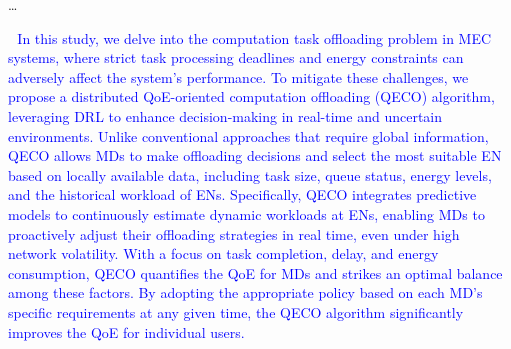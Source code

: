 \documentclass[12pt,draftclsnofoot,onecolumn]{IEEEtran}
\newcommand{\rev}[1]{{\color{blue}#1}} %
\newcommand{\rev}[1]{#1}
\newenvironment{my}[2]%
{\begin{list}{}%
{\setlength{\rightmargin}{#1}\setlength{\leftmargin}{#2}}%


 \item[]{}

} {\end{list}}
\begin{document}
\begin{enumerate}
\begin{my}{1cm}{1cm}
	\rev{ 
	
	\dots





\textcolor{blue}{\,\,\,\,In this study, we delve into the computation task offloading problem in MEC systems, where strict task processing deadlines and energy constraints can adversely affect the system's performance. To mitigate these challenges, we propose a distributed QoE-oriented computation offloading (QECO) algorithm, leveraging DRL to enhance decision-making in real-time and uncertain environments. Unlike conventional approaches that require global information, QECO allows MDs to make offloading decisions and select the most suitable EN based on locally available data, including task size, queue status, energy levels, and the historical workload of ENs. Specifically, QECO integrates predictive models to continuously estimate dynamic workloads at ENs, enabling MDs to proactively adjust their offloading strategies in real time, even under high network volatility. With a focus on task completion, delay, and energy consumption, QECO quantifies the QoE for MDs and strikes an optimal balance among these factors. By adopting the appropriate policy based on each MD’s specific requirements at any given time, the QECO algorithm significantly improves the QoE for individual users.}

}
\end{my}
\end{enumerate}
\end{document}
